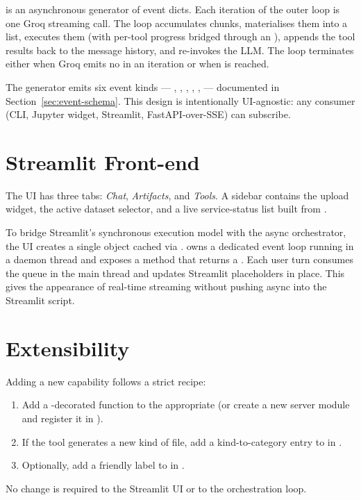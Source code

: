  is an asynchronous generator of event dicts.
Each iteration of the outer  loop is one Groq streaming
call. The loop accumulates  chunks, materialises
them into a list, executes them (with per-tool progress bridged
through an ), appends the tool results back to
the message history, and re-invokes the LLM. The loop terminates
either when Groq emits no  in an iteration or when
 is reached.

The generator emits six event kinds --- ,
, , ,
,  --- documented in
Section~\ref{sec:event-schema}. This design is intentionally
UI-agnostic: any consumer (CLI, Jupyter widget, Streamlit,
FastAPI-over-SSE) can subscribe.

\section{Streamlit Front-end}
\label{sec:st-design}

The UI has three tabs: \emph{Chat}, \emph{Artifacts}, and
\emph{Tools}. A sidebar contains the upload widget, the active
dataset selector, and a live service-status list built from
.

To bridge Streamlit's synchronous execution model with the async
orchestrator, the UI creates a single  object cached
via .  owns a dedicated
event loop running in a daemon thread and exposes a
 method that
returns a . Each user turn consumes the queue in
the main thread and updates Streamlit placeholders in place. This
gives the appearance of real-time streaming without pushing async
into the Streamlit script.

\section{Extensibility}
\label{sec:extensibility}

Adding a new capability follows a strict recipe:

\begin{enumerate}[leftmargin=1.4em]
  \item Add a -decorated function to the appropriate
         (or create a new server
        module and register it in
        ).
  \item If the tool generates a new kind of file, add a
        kind-to-category entry to  in
        .
  \item Optionally, add a friendly label to  in
        .
\end{enumerate}

No change is required to the Streamlit UI or to the orchestration
loop.
